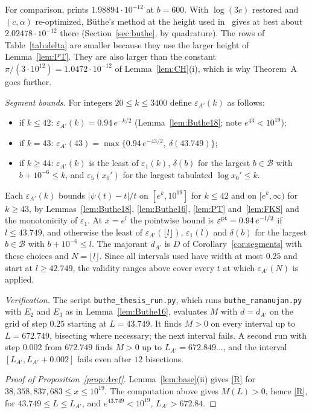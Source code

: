 \documentclass{amsart}
\theoremstyle{definition}
\theoremstyle{remark}
\theoremstyle{plain}
\numberwithin{equation}{section}
\newcommand{\eps}{\varepsilon}
\newcommand{\NN}{38{,}358{,}837{,}683}
\begin{document}
For comparison, \cite[Table~8]{BKLNW21} prints $1.98894\cdot10^{-12}$ at $b=600$. With $\log(3c)$ restored and $(c,\alpha)$ re-optimized, B\"uthe's method at the height used in~\cite{BKLNW21} gives at best about $2.02478\cdot10^{-12}$ there (Section~\ref{sec:buthe}, by quadrature). The rows of Table~\ref{tab:delta} are smaller because they use the larger height of Lemma~\ref{lem:PT}. They are also larger than the constant $\pi/(3\cdot10^{12})=1.0472\cdot10^{-12}$ of Lemma~\ref{lem:CH}(i), which is why Theorem~A goes further.

\emph{Segment bounds.} For integers $20\le k\le3400$ define $\eps_{A'}(k)$ as follows:
\begin{itemize}
\item if $k\le42$: $\eps_{A'}(k)=0.94\,e^{-k/2}$ (Lemma~\ref{lem:Buthe18}; note $e^{43}<10^{19}$);
\item if $k=43$: $\eps_{A'}(43)=\max\{0.94\,e^{-43/2},\ \delta(43.749)\}$;
\item if $k\ge44$: $\eps_{A'}(k)$ is the least of $\eps_1(k)$, $\delta(b)$ for the largest $b\in\mathcal B$ with $b+10^{-6}\le k$, and $\eps_5(x_0')$ for the largest tabulated $\log x_0'\le k$.
\end{itemize}
Each $\eps_{A'}(k)$ bounds $|\psi(t)-t|/t$ on $[e^k,10^{19}]$ for $k\le42$ and on $[e^k,\infty)$ for $k\ge43$, by Lemmas~\ref{lem:Buthe18}, \ref{lem:Buthe16}, \ref{lem:PT} and~\ref{lem:FKS} and the monotonicity of $\eps_1$. At $x=e^l$ the pointwise bound is $\eps^{\rm pt}=0.94\,e^{-l/2}$ if $l\le43.749$, and otherwise the least of $\eps_{A'}(\lfloor l\rfloor)$, $\eps_1(l)$ and $\delta(b)$ for the largest $b\in\mathcal B$ with $b+10^{-6}\le l$. The majorant $d_{A'}$ is $D$ of Corollary~\ref{cor:segments} with these choices and $N=\lfloor l\rfloor$. Since all intervals used have width at most $0.25$ and start at $l\ge42.749$, the validity ranges above cover every $t$ at which $\eps_{A'}(N)$ is applied.

\emph{Verification.} The script \texttt{buthe\_thesis\_run.py}, which runs \texttt{buthe\_ramanujan.py} with $E_2$ and $E_3$ as in Lemma~\ref{lem:Buthe16}, evaluates $M$ with $d=d_{A'}$ on the grid of step $0.25$ starting at $L=43.749$. It finds $M>0$ on every interval up to $L=672.749$, bisecting where necessary; the next interval fails. A second run with step $0.002$ from $672.749$ finds $M>0$ up to $L_{A'}=672.849\ldots$, and the interval $[L_{A'},L_{A'}+0.002]$ fails even after $12$ bisections.

\begin{proof}[Proof of Proposition~\ref{prop:Aref}]
Lemma~\ref{lem:base}(ii) gives \eqref{R} for $\NN\le x\le10^{19}$. The computation above gives $M(L)>0$, hence \eqref{R}, for $43.749\le L\le L_{A'}$, and $e^{43.749}<10^{19}$, $L_{A'}>672.84$.
\end{proof}
\end{document}
